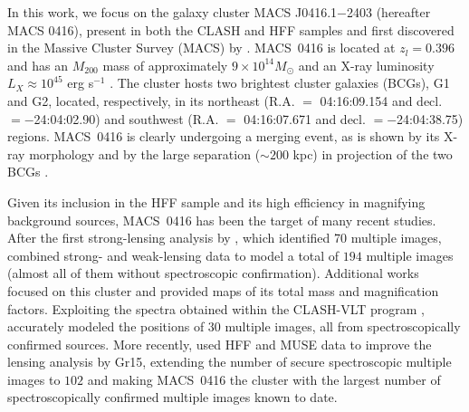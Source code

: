 \documentclass[twocolumn]{aastex61}
\begin{document}
In this work, we focus on the galaxy cluster MACS J0416.1$-$2403 (hereafter MACS
0416), present in both the CLASH and HFF samples and first discovered in the Massive
Cluster Survey (MACS) by \citet{Mann2012}.
MACS~0416 is located at $z_l = 0.396$ and has an $M_{200}$ mass of approximately $9 \times 10^{14} M_\odot$
and an X-ray luminosity $L_X \approx 10^{45}$ erg s$^{-1}$ \citep{Balestra2016}.
The cluster hosts two brightest cluster galaxies (BCGs), G1 and G2, located,
respectively, in its northeast (R.A. $=$ 04:16:09.154 and decl. $= -$24:04:02.90)
and southwest (R.A. $=$ 04:16:07.671 and decl. $= -$24:04:38.75) regions.
MACS~0416 is clearly undergoing a merging event, as is shown by its X-ray
morphology and by the large separation ($\sim 200$ kpc) in projection of the two
BCGs \citep{Mann2012}.

Given its inclusion in the HFF sample and its high efficiency in magnifying
background sources, MACS~0416 has been the target of many recent studies.
After the first strong-lensing analysis by \citet{Zitrin2013},
which identified 70 multiple images, \citet{Jauzac2014,Jauzac2015} combined
strong- and weak-lensing data to model a total of $194$ multiple images (almost
all of them without spectroscopic confirmation).
Additional works \citep{Johnson2014,Richard2014,Diego2015} focused on this cluster
and provided maps of its total mass and magnification factors.
Exploiting the spectra obtained within the CLASH-VLT program 
\citep[presented in][]{Balestra2016}, \citet[hereafter Gr15]{Grillo2015}
accurately modeled the positions of $30$ multiple images, all from spectroscopically confirmed sources.
More recently, \citet[][hereafter Ca17]{Caminha2017} used HFF and MUSE data to improve the lensing analysis by Gr15,
extending the number of secure spectroscopic multiple images to $102$ and making MACS~0416 the cluster
with the largest number of spectroscopically confirmed multiple images known to date.
\end{document}
